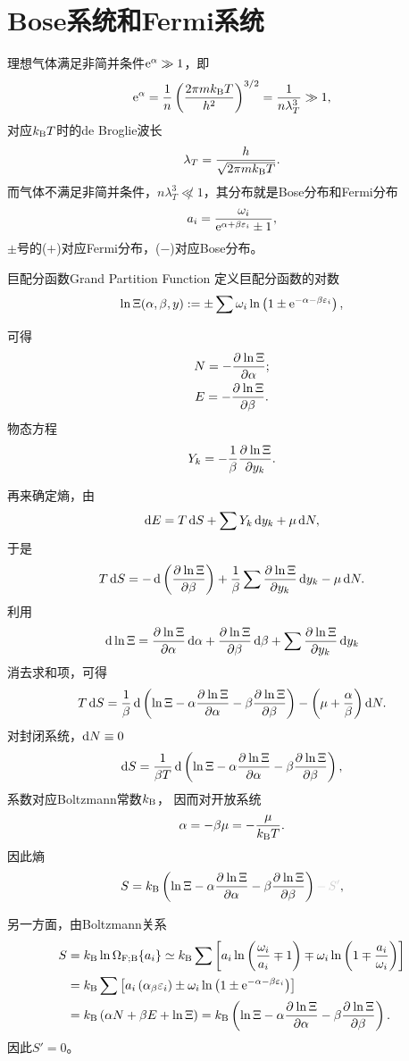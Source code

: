 \chapter{Bose系统和Fermi系统}
理想气体满足非简并条件$\e\alpha\gg 1$，即
\[
	\e\alpha=\frac1n\kh{\frac{2\pi m\kB T}{h^2}}^{3/2}=\frac1{n\lambda_T^3}\gg 1,
\]
对应$\kB T$时的de Broglie波长
\begin{align}\label{T-deB}
	\lambda_T=\frac{h}{\sqrt{2\pi m\kB T}}.
\end{align}
而气体不满足非简并条件，$n\lambda_T^3\not\ll 1$，其分布就是Bose分布和Fermi分布%
\begin{align}
	a_i=\frac{\omega_i}{\e{\alpha+\beta\varepsilon_i}\pm 1},
\end{align}
$\pm$号的($+$)对应Fermi分布，($-$)对应Bose分布。
\begin{definition}{巨配分函数}{Grand Partition Function}
	定义巨配分函数的对数
	\begin{align}
		\ln\Xi(\alpha,\beta,y):=\pm\sum\omega_i\ln\kh{1\pm\e{-\alpha-\beta\varepsilon_i}},
	\end{align}
\end{definition}
可得
\begin{gather}
	N=-\pv{\ln\Xi}{\alpha};\\ %
	E=-\pv{\ln\Xi}{\beta}.
\end{gather}
物态方程
\begin{align}
	Y_k=-\frac1\beta\pv{\ln\Xi}{y_k}.
\end{align}

再来确定熵，由
\[
	\d E=T\d S+\sum Y_k\d y_k+\mu\d N,
\]
于是
\[
	T\d S=-\d\kh{\pv{\ln\Xi}\beta}+\frac1\beta\sum\pv{\ln\Xi}{y_k}\d y_k-\mu\d N.
\]
利用
\[
	\d\ln\Xi=\pv{\ln\Xi}\alpha\d\alpha+\pv{\ln\Xi}\beta\d\beta+\sum\pv{\ln\Xi}{y_k}\d y_k
\]
消去求和项，可得
\[
	T\d S=\frac1\beta\d\kh{\ln\Xi-\alpha\pv{\ln\Xi}\alpha-\beta\pv{\ln\Xi}\beta}-\kh{\mu+\frac\alpha\beta}\d N.
\]
对封闭系统，$\d N\equiv 0$
\[
	\d S=\frac1{\beta T}\d\kh{\ln\Xi-\alpha\pv{\ln\Xi}\alpha-\beta\pv{\ln\Xi}\beta},
\]
系数对应Boltzmann常数$\kB$，
因而对开放系统
\begin{align}\label{Bose-mu}
	\alpha=-\beta\mu=-\frac\mu{\kB T}.
\end{align}
因此熵
\begin{align}
	S=\kB\kh{\ln\Xi-\alpha\pv{\ln\Xi}\alpha-\beta\pv{\ln\Xi}\beta}{\color[gray]{.8}-\,S'},
\end{align}

另一方面，由Boltzmann关系
\begin{align*}
	S & =\kB\ln\Om[F;B]\simeq\kB\sum\fkh{a_i\ln\kh{\frac{\omega_i}{a_i}\mp 1}\mp\omega_i\ln\kh{1\mp\frac{a_i}{\omega_i}}} \\
	  & =\kB\sum\fkh{a_i\kh{\alpha_\beta\varepsilon_i}\pm\omega_i\ln\kh{1\pm\e{-\alpha-\beta\varepsilon_i}}}                             \\
	  & =\kB\kh{\alpha N+\beta E+\ln\Xi}=\kB\kh{\ln\Xi-\alpha\pv{\ln\Xi}\alpha-\beta\pv{\ln\Xi}\beta}.
\end{align*}
因此$S'=0$。
